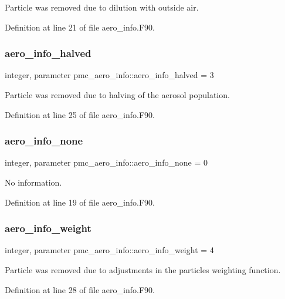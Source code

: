 Particle was removed due to dilution with outside air. 



Definition at line 21 of file aero\+\_\+info.\+F90.

\mbox{\label{namespacepmc__aero__info_a80aed32f3d631b141971d2566a31ec25}} 
\subsubsection{\texorpdfstring{aero\+\_\+info\+\_\+halved}{aero\_info\_halved}}
{\footnotesize\ttfamily integer, parameter pmc\+\_\+aero\+\_\+info\+::aero\+\_\+info\+\_\+halved = 3}



Particle was removed due to halving of the aerosol population. 



Definition at line 25 of file aero\+\_\+info.\+F90.

\mbox{\label{namespacepmc__aero__info_ad921514d23f504dc3475f673268bd460}} 
\subsubsection{\texorpdfstring{aero\+\_\+info\+\_\+none}{aero\_info\_none}}
{\footnotesize\ttfamily integer, parameter pmc\+\_\+aero\+\_\+info\+::aero\+\_\+info\+\_\+none = 0}



No information. 



Definition at line 19 of file aero\+\_\+info.\+F90.

\mbox{\label{namespacepmc__aero__info_a458b6653bdab26796cced7b90c68fbc6}} 
\subsubsection{\texorpdfstring{aero\+\_\+info\+\_\+weight}{aero\_info\_weight}}
{\footnotesize\ttfamily integer, parameter pmc\+\_\+aero\+\_\+info\+::aero\+\_\+info\+\_\+weight = 4}



Particle was removed due to adjustments in the particle\textquotesingle{}s weighting function. 



Definition at line 28 of file aero\+\_\+info.\+F90.


